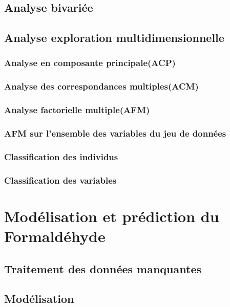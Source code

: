 \documentclass[11pt,a4paper, x11names]{article}\usepackage[]{graphicx}\usepackage[]{color}
\begin{document}
\subsection{Analyse bivariée}



\subsection{Analyse exploration multidimensionnelle}
\subsubsection{Analyse en composante principale(ACP)}

\subsubsection{Analyse des correspondances multiples(ACM)}

\subsubsection{Analyse factorielle multiple(AFM)}


\subsubsection{AFM sur l'ensemble des variables du jeu de données}

\subsubsection{Classification des individus}

\subsubsection{Classification des variables}


\section{Modélisation et prédiction du Formaldéhyde}


\subsection{Traitement des données manquantes}
\subsection{Modélisation}
\end{document}
